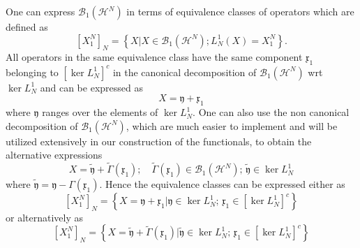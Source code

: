 \documentclass[aps,preprint]{revtex4}%
\begin{document}
One can express $\mathcal{B}_{1}\left(  \mathcal{H}^{N}\right)  $ in terms of
equivalence classes of operators which are defined as%
\begin{equation}
\left[  X_{1}^{N}\right]  _{N}=\left\{  X|X\in\mathcal{B}_{1}\left(
\mathcal{H}^{N}\right)  ;L_{N}^{1}\left(  X\right)  =X_{1}^{N}\right\}  .
\end{equation}
All operators in the same equivalence class have the same component
$\mathfrak{x}_{1}$ belonging to $\left[  \ker L_{N}^{1}\right]  ^{c}$ in the
canonical decomposition of $\mathcal{B}_{1}\left(  \mathcal{H}^{N}\right)  $
wrt $\ker L_{N}^{1}$ and can be expressed as
\begin{equation}
X=\mathfrak{y}+\mathfrak{x}_{1}%
\end{equation}
where $\mathfrak{y}$ ranges over the elements of $\ker L_{N}^{1}$. One can
also use the non canonical decomposition of $\mathcal{B}_{1}\left(
\mathcal{H}^{N}\right)  $, which are much easier to implement and will be
utilized extensively in our construction of the functionals, to obtain the
alternative expressions
\begin{equation}
X=\mathfrak{\tilde{y}}+\tilde{\Gamma}\left(  \mathfrak{x}_{1}\right)
;\quad\tilde{\Gamma}\left(  \mathfrak{x}_{1}\right)  \in\mathcal{B}_{1}\left(
\mathcal{H}^{N}\right)  ;\,\mathfrak{\tilde{y}}\in\ker L_{N}^{1}%
\end{equation}
where $\mathfrak{\tilde{y}}=\mathfrak{y}-\Gamma\left(  \mathfrak{x}%
_{1}\right)  $. Hence the equivalence classes can be expressed either as
\begin{equation}
\left[  X_{1}^{N}\right]  _{N}=\left\{  X=\mathfrak{y}+\mathfrak{x}%
_{1}|\mathfrak{y}\in\ker L_{N}^{1};\,\mathfrak{x}_{1}\in\left[  \ker L_{N}%
^{1}\right]  ^{c}\right\}
\end{equation}
or alternatively as
\begin{equation}
\left[  X_{1}^{N}\right]  _{N}=\left\{  X=\mathfrak{\tilde{y}}+\tilde{\Gamma
}\left(  \mathfrak{x}_{1}\right)  |\mathfrak{\tilde{y}}\in\ker L_{N}%
^{1};\,\mathfrak{x}_{1}\in\left[  \ker L_{N}^{1}\right]  ^{c}\right\}
\end{equation}
\end{document}
